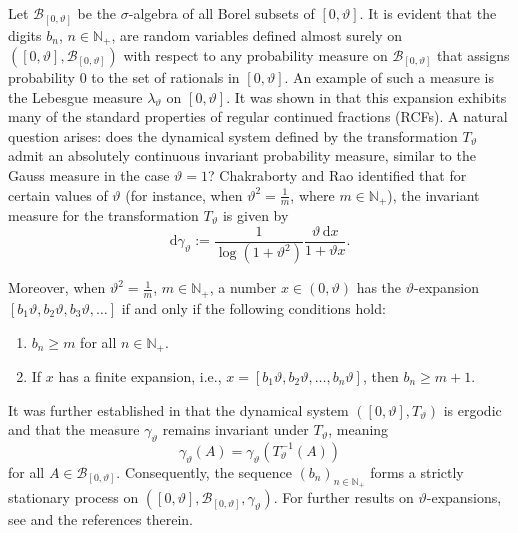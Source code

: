 \documentclass[final,1p,times]{elsarticle}
\numberwithin{equation}{section}
\begin{document}
Let $\mathcal{B}_{[0,\vartheta]}$ be the $\sigma$-algebra of all Borel subsets of $[0,\vartheta]$. It is evident that the digits $b_n$, $n \in \mathbb{N}_+$, are random variables defined almost surely on $\left( [0, \vartheta], \mathcal{B}_{[0,\vartheta]}\right)$ with respect to any probability measure on $\mathcal{B}_{[0,\vartheta]}$ that assigns probability $0$ to the set of rationals in $[0, \vartheta]$.  
An example of such a measure is the Lebesgue measure $\lambda_{\vartheta}$ on $[0, \vartheta]$.
It was shown in \cite{CR-2003,SL-2014} that this expansion exhibits many of the standard properties of regular continued fractions (RCFs).  
A natural question arises: does the dynamical system defined by the transformation $T_{\vartheta}$ admit an absolutely continuous invariant probability measure, similar to the Gauss measure in the case $\vartheta = 1$?  Chakraborty and Rao \cite{CR-2003} identified that for certain values of $\vartheta$ (for instance, when $\vartheta^2 = \frac{1}{m}$, where $m \in \mathbb{N}_+$), the invariant measure for the transformation $T_{\vartheta}$ is given by  
%
\begin{equation}\label{1.3}
\mathrm{d}\gamma_{\vartheta} := \frac{1}{\log \left(1+\vartheta^{2}\right)}
\frac{\vartheta \,\mathrm{d}x}{1 + \vartheta x}.
\end{equation}
%

Moreover, when $\vartheta^2 = \frac{1}{m}$, $m \in \mathbb{N}_+$, a number $x \in (0, \vartheta)$ has the $\vartheta$-expansion $[b_1 \vartheta, b_2 \vartheta, b_3 \vartheta, \ldots]$ if and only if the following conditions hold:  
\begin{enumerate}
\item [(i)] $b_n \geq m$ for all $n \in \mathbb{N}_+$.
\item [(ii)] If $x$ has a finite expansion, i.e., $x = [b_1 \vartheta, b_2 \vartheta, \ldots,  b_n \vartheta]$, then $b_n \geq m+1$.
\end{enumerate}
It was further established in \cite{CR-2003} that the dynamical system  
$([0,\vartheta], T_{\vartheta})$ is ergodic and that the measure $\gamma_{\vartheta}$ remains invariant under $T_{\vartheta}$, meaning  
\[
\gamma_{\vartheta} (A) = \gamma_{\vartheta} (T^{-1}_{\vartheta}(A))
\]
for all $A \in {\mathcal{B}}_{[0, \vartheta]}$.  
Consequently, the sequence $(b_n)_{n \in \mathbb{N}_+}$ forms a strictly stationary process on $([0,\vartheta],{\mathcal B}_{[0,\vartheta]},\gamma_{\vartheta})$.  
For further results on $\vartheta$-expansions, see \cite{CD-2004,Sebe-2017,SL-2014, SL-2019, SL-2025} and the references therein.
\end{document}
